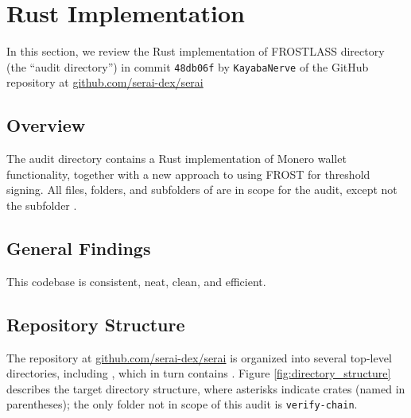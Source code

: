 \section{Rust Implementation}

In this section, we review the Rust implementation of FROSTLASS  directory (the ``audit directory'') in commit \texttt{48db06f} by \texttt{KayabaNerve} of the GitHub repository at \url{github.com/serai-dex/serai}

\subsection{Overview}

The audit directory contains a Rust implementation of Monero wallet functionality, together with a new approach to using FROST for threshold signing. All files, folders, and subfolders of 
 are in scope for the audit, except not the subfolder .

\subsection{General Findings}

This codebase is consistent, neat, clean, and efficient.

\subsection{Repository Structure}

The repository at \url{github.com/serai-dex/serai} is organized into several top-level directories, including , which in turn contains .  Figure \ref{fig:directory_structure} describes the target directory structure, where asterisks indicate crates (named in parentheses); the only folder not in scope of this audit is \texttt{verify-chain}. 


